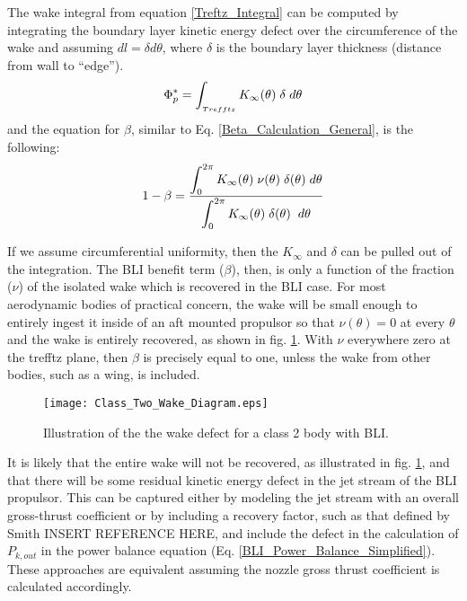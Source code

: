 					The wake integral from equation \ref{Treftz_Integral} can be computed by integrating the boundary layer kinetic energy defect over the circumference of the wake and assuming $dl = \delta d\theta$, where $\delta$ is the boundary layer thickness (distance from wall to ``edge'').
					\begin{equation}
						\Phi_p^* = \int_{_{Trefftz}} K_\infty(\theta) \hspace{1mm} \delta \hspace{1mm} d\theta
					\end{equation}
					and the equation for $\beta$, similar to Eq. \ref{Beta_Calculation_General}, is the following:
					\begin{equation}
						1 - \beta = \frac{\displaystyle \int_0^{2\pi} K_\infty (\theta)\hspace{1mm} \nu(\theta) \hspace{1mm}\delta(\theta) \hspace{1mm} d\theta}
										 {\displaystyle \int_0^{2\pi} K_\infty(\theta) \hspace{1mm}\delta (\theta) \hspace{1mm}\hspace{1mm} d\theta}
						 \label{eq:Class2_Beta_Equation}
					\end{equation}
					
					If we assume circumferential uniformity, then the $K_\infty$ and $\delta$ can be pulled out of the integration.  The BLI benefit term ($\beta$), then, is only a function of the fraction ($\nu$) of the isolated wake which is recovered in the BLI case.  For most aerodynamic bodies of practical concern, the wake will be small enough to entirely ingest it inside of an aft mounted propulsor so that $\nu(\theta) = 0$ at every $\theta$ and the wake is entirely recovered, as shown in fig. \ref{Class_Two_Wake_Diagram}.  With $\nu$ everywhere zero at the trefftz plane, then $\beta$ is precisely equal to one, unless the wake from other bodies, such as a wing, is included.  							
					\begin{figure}[htp]
						\centering
						\vspace{5mm}
						\texttt{[image: Class\_Two\_Wake\_Diagram.eps]}
						\caption{Illustration of the the wake defect for a class 2 body with BLI.}
						\label{Class_Two_Wake_Diagram}
					\end{figure}
					It is likely that the entire wake will not be recovered, as illustrated in fig. \ref{Class_Two_Wake_Diagram}, and that there will be some residual kinetic energy defect in the jet stream of the BLI propulsor.  This can be captured either by modeling the jet stream with an overall gross-thrust coefficient or by including a recovery factor, such as that defined by Smith INSERT REFERENCE HERE, and include the defect in the calculation of $P_{k,{out}}$ in the power balance equation (Eq. \ref{BLI_Power_Balance_Simplified}).  These approaches are equivalent assuming the nozzle gross thrust coefficient is calculated accordingly.
					
